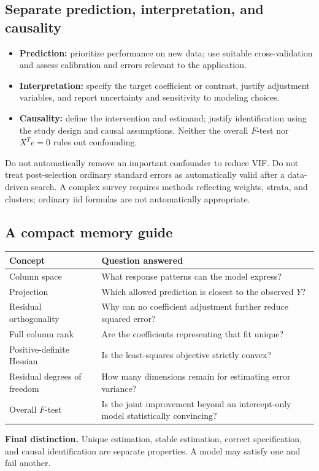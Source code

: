 \documentclass[11pt]{article}
\begin{document}
\subsection*{Separate prediction, interpretation, and causality}
\begin{itemize}
\item \textbf{Prediction:} prioritize performance on new data; use suitable cross-validation and assess calibration and errors relevant to the application.
\item \textbf{Interpretation:} specify the target coefficient or contrast, justify adjustment variables, and report uncertainty and sensitivity to modeling choices.
\item \textbf{Causality:} define the intervention and estimand; justify identification using the study design and causal assumptions. Neither the overall $F$-test nor $X^Te=0$ rules out confounding.
\end{itemize}
Do not automatically remove an important confounder to reduce VIF. Do not treat post-selection ordinary standard errors as automatically valid after a data-driven search. A complex survey requires methods reflecting weights, strata, and clusters; ordinary iid formulas are not automatically appropriate.

\subsection*{A compact memory guide}
\begin{center}
\begin{tabular}{p{.25\linewidth}p{.65\linewidth}}\toprule
Concept&Question answered\\\midrule
Column space&What response patterns can the model express?\\
Projection&Which allowed prediction is closest to the observed $Y$?\\
Residual orthogonality&Why can no coefficient adjustment further reduce squared error?\\
Full column rank&Are the coefficients representing that fit unique?\\
Positive-definite Hessian&Is the least-squares objective strictly convex?\\
Residual degrees of freedom&How many dimensions remain for estimating error variance?\\
Overall $F$-test&Is the joint improvement beyond an intercept-only model statistically convincing?\\\bottomrule
\end{tabular}
\end{center}
\textbf{Final distinction.} Unique estimation, stable estimation, correct specification, and causal identification are separate properties. A model may satisfy one and fail another.
\end{document}
